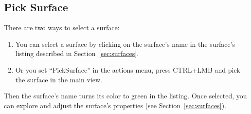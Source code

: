 \subsection{Pick Surface}
\label{sec:pickSurface}

There are two ways to select a surface:

\begin{enumerate}
	\item You can select a surface by clicking on the surface's name in the surface's listing described in Section~\ref{sec:surfaces}.
	\item Or you set ``PickSurface'' in the actions menu, press CTRL+LMB and pick the surface in the main view.
\end{enumerate}
Then the surface's name turns its color to green in the listing. Once selected, you can explore and adjust the surface's properties (see Section~\ref{sec:surfaces}).




